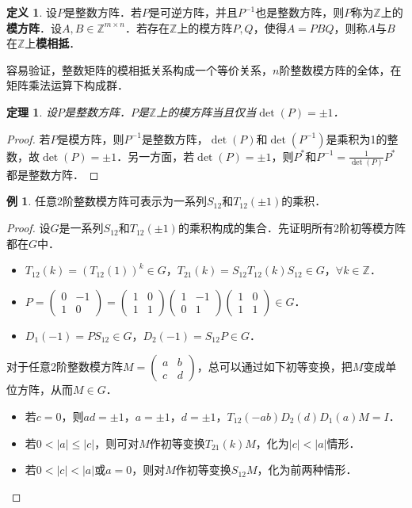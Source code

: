 \documentclass[a4paper,fontset=windows]{ctexbook}
\newtheorem{theorem}{定理}[chapter]
\theoremstyle{definition}
\newtheorem{definition}{定义}[chapter]
\newtheorem{example}{例}[chapter]
\renewcommand{\le}{\leqslant}
\begin{document}
\begin{definition}
设$P$是整数方阵．若$P$是可逆方阵，并且$P^{-1}$也是整数方阵，则$P$称为$\mathbb{Z}$上的{\bf 模方阵}．设$A,B\in\mathbb{Z}^{m\times n}$．若存在$\mathbb{Z}$上的模方阵$P,Q$，使得$A=PBQ$，则称$A$与$B$在$\mathbb{Z}$上{\bf 模相抵}．
\end{definition}

容易验证，整数矩阵的模相抵关系构成一个等价关系，$n$阶整数模方阵的全体，在矩阵乘法运算下构成群．

\begin{theorem}
设$P$是整数方阵．$P$是$\mathbb{Z}$上的模方阵当且仅当$\det(P)=\pm 1$．
\end{theorem}

\begin{proof}
若$P$是模方阵，则$P^{-1}$是整数方阵，$\det(P)$和$\det(P^{-1})$是乘积为1的整数，故$\det(P)=\pm 1$．另一方面，若$\det(P)=\pm 1$，则$P^*$和$P^{-1}=\frac{1}{\det(P)}P^*$都是整数方阵．
\end{proof}

\begin{example}
任意2阶整数模方阵可表示为一系列$S_{12}$和$T_{12}(\pm 1)$的乘积．
\end{example}

\begin{proof}
设$G$是一系列$S_{12}$和$T_{12}(\pm 1)$的乘积构成的集合．先证明所有2阶初等模方阵都在$G$中．
\begin{itemize}
\item $T_{12}(k)=\left(T_{12}(1)\right)^k\in G$，$T_{21}(k)=S_{12}T_{12}(k)S_{12}\in G$，$\forall k\in\mathbb{Z}$．
\item $P=\begin{pmatrix}0&-1 \\ 1&0\end{pmatrix}=\begin{pmatrix}1&0 \\ 1&1\end{pmatrix}\begin{pmatrix}1&-1 \\ 0&1\end{pmatrix}\begin{pmatrix}1&0 \\ 1&1\end{pmatrix}\in G$．
\item $D_1(-1)=PS_{12}\in G$，$D_2(-1)=S_{12}P\in G$．
\end{itemize}
对于任意2阶整数模方阵$M=\begin{pmatrix}a&b \\ c&d\end{pmatrix}$，总可以通过如下初等变换，把$M$变成单位方阵，从而$M\in G$．
\begin{itemize}
\item 若$c=0$，则$ad=\pm 1$，$a=\pm 1$，$d=\pm 1$，$T_{12}(-ab)D_2(d)D_1(a)M=I$．
\item 若$0<|a|\le|c|$，则可对$M$作初等变换$T_{21}(k)M$，化为$|c|<|a|$情形．
\item 若$0<|c|<|a|$或$a=0$，则对$M$作初等变换$S_{12}M$，化为前两种情形．\qedhere
\end{itemize}
\end{proof}
\end{document}
